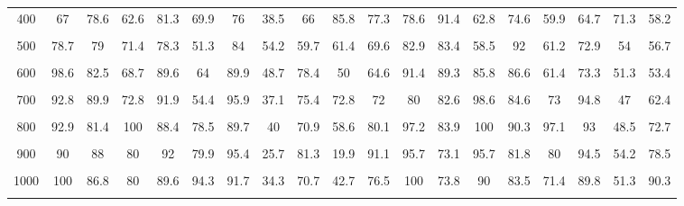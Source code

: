 \begin{table*}[ht]
{\begin{tabular}{l cccccc		cccccc		cccccc}
\\[-2ex]
\multicolumn{1}{c}{400} & 67 & 78.6 & 62.6 & 81.3 & 69.9 & 76 & 38.5 & 66 & \cellcolor[gray]{0.75}85.8 & \cellcolor[gray]{0.75}77.3 & 78.6 & 91.4 & 62.8 & 74.6 & 59.9 & 64.7 & \cellcolor[gray]{0.5}71.3 & \cellcolor[gray]{0.5}58.2  \\ 
\\[-2ex]
\multicolumn{1}{c}{500} & 78.7 & 79 & 71.4 & 78.3 & 51.3 & 84 & \cellcolor[gray]{0.9}54.2 & \cellcolor[gray]{0.9}59.7 & 61.4 & 69.6 & 82.9 & 83.4 & 58.5 & 92 &  61.2 & 72.9 & \cellcolor[gray]{0.9}54 & \cellcolor[gray]{0.9}56.7 \\
\\[-2ex]
\multicolumn{1}{c}{600} & \cellcolor[gray]{0.75}98.6 & \cellcolor[gray]{0.75}82.5 & 68.7 & 89.6 & 64   & 89.9 & 48.7 & 78.4 & 50   & 64.6 & 91.4 & 89.3 & 85.8 & 86.6 &  61.4 & 73.3 & 51.3 & 53.4 \\
\\[-2ex]
\multicolumn{1}{c}{700} & 92.8 & 89.9 & 72.8 & 91.9 & 54.4 & 95.9 & 37.1 & 75.4 & \cellcolor[gray]{0.9}72.8 &  \cellcolor[gray]{0.9}72 & 80 & 82.6 & \cellcolor[gray]{0.75}98.6 & \cellcolor[gray]{0.75}84.6 & \cellcolor[gray]{0.9}73 & \cellcolor[gray]{0.9}94.8 & 47 & 62.4 \\
\\[-2ex] 
\multicolumn{1}{c}{800} & \cellcolor[gray]{0.9}92.9 & \cellcolor[gray]{0.9}81.4 & \cellcolor[gray]{0.5}100  &\cellcolor[gray]{0.5}88.4 & \cellcolor[gray]{0.9}78.5 & \cellcolor[gray]{0.9}89.7 & 40   & 70.9 & 58.6 & 80.1 & \cellcolor[gray]{0.75}97.2 & \cellcolor[gray]{0.75}83.9 & \cellcolor[gray]{0.5}100 & \cellcolor[gray]{0.5}90.3 & \cellcolor[gray]{0.5}97.1 & \cellcolor[gray]{0.5}93 & 48.5 & 72.7\\
\\[-2ex]
\multicolumn{1}{c}{900} & 90 & 88  & \cellcolor[gray]{0.75}80  & \cellcolor[gray]{0.75}92 & \cellcolor[gray]{0.75}79.9 & \cellcolor[gray]{0.75}95.4 & 25.7 & 81.3 & 19.9 & 91.1 & \cellcolor[gray]{0.9}95.7 & \cellcolor[gray]{0.9}73.1 & \cellcolor[gray]{0.9}95.7 & \cellcolor[gray]{0.9}81.8 & \cellcolor[gray]{0.75}80 & \cellcolor[gray]{0.75}94.5 & \cellcolor[gray]{0.75}54.2 & \cellcolor[gray]{0.75}78.5 \\
\\[-2ex]
\multicolumn{1}{c}{1000}& \cellcolor[gray]{0.5}100 & \cellcolor[gray]{0.5}86.8 & \cellcolor[gray]{0.9}80 & \cellcolor[gray]{0.9}89.6 & \cellcolor[gray]{0.5}94.3 & \cellcolor[gray]{0.5}91.7 & 34.3 & 70.7 & 42.7 & 76.5 &\cellcolor[gray]{0.5}100  & \cellcolor[gray]{0.5}73.8 & 90   & 83.5 &  71.4  & 89.8 & 51.3 & 90.3 \\
\\[-2ex]
\bottomrule
\end{tabular}
}
\label{tab:allres}
\end{table*}

